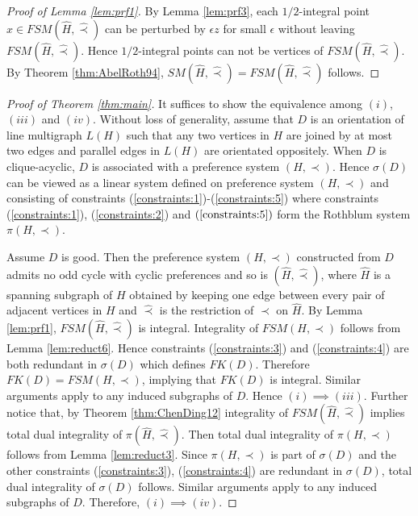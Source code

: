 \documentclass[11pt]{article}
\numberwithin{theorem}{section}
\begin{document}
\begin{proof}[Proof of Lemma \ref{lem:prf1}]
By Lemma \ref{lem:prf3}, each $1/2$-integral point $x\in FSM(\hat{H},\hat\prec)$ can be perturbed by $\epsilon z$ for small $\epsilon$ without leaving $FSM(\hat{H},\hat\prec)$. Hence $1/2$-integral points can not be vertices of $FSM(\hat{H},\hat\prec)$. By Theorem \ref{thm:AbelRoth94}, $SM(\hat{H},\hat\prec)=FSM(\hat{H},\hat\prec)$ follows. 
\end{proof}

\begin{proof}[Proof of Theorem \ref{thm:main}]
It suffices to show the equivalence among $(i)$, $(iii)$ and $(iv)$. Without loss of generality, assume that $D$ is an orientation of line multigraph $L(H)$ such that any two vertices in $H$ are joined by at most two edges and parallel edges in $L(H)$ are orientated oppositely. When $D$ is clique-acyclic, $D$ is associated with a preference system $(H,\prec)$. Hence $\sigma(D)$ can be viewed as a linear system defined on preference system $(H,\prec)$ and consisting of constraints (\ref{constraints:1})-(\ref{constraints:5}) where constraints (\ref{constraints:1}), (\ref{constraints:2}) and $(\ref{constraints:5})$ form the Rothblum system $\pi(H,\prec)$.

Assume $D$ is good. Then the preference system $(H,\prec)$ constructed from $D$ admits no odd cycle with cyclic preferences and so is $(\hat{H},\hat\prec)$, where $\hat{H}$ is a spanning subgraph of $H$ obtained by keeping one edge between every pair of adjacent vertices in $H$ and $\hat\prec$ is the restriction of $\prec$ on $\hat{H}$. By Lemma \ref{lem:prf1}, $FSM(\hat{H},\hat\prec)$ is integral. Integrality of $FSM(H,\prec)$ follows from Lemma \ref{lem:reduct6}. Hence constraints (\ref{constraints:3}) and (\ref{constraints:4}) are both redundant in $\sigma(D)$ which defines $FK(D)$. Therefore $FK(D)=FSM(H,\prec)$, implying that $FK(D)$ is integral. Similar arguments apply to any induced subgraphs of $D$. Hence $(i)\implies (iii)$. Further notice that, by Theorem \ref{thm:ChenDing12} integrality of $FSM(\hat{H},\hat\prec)$ implies total dual integrality of $\pi(\hat{H},\hat\prec)$. Then total dual integrality of $\pi(H,\prec)$ follows from Lemma \ref{lem:reduct3}. Since $\pi(H,\prec)$ is part of $\sigma(D)$ and the other constraints (\ref{constraints:3}), (\ref{constraints:4}) are redundant in $\sigma(D)$, total dual integrality of $\sigma(D)$ follows. Similar arguments apply to any induced subgraphs of $D$. Therefore, $(i)\implies (iv)$.


\end{proof}
\end{document}
